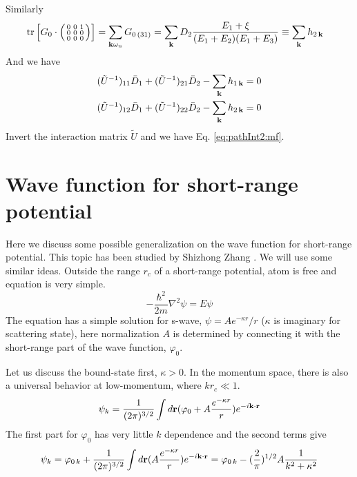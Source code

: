 Similarly
\begin{equation}
\begin{split}
\text{tr}\left[{G_{0}}\cdot\left(\begin{smallmatrix}0&0&1\\0&0&0\\0&0&0\end{smallmatrix}\right)\right]&=\sum_{\mathbf{k}\omega_{n}}G_{0\,(31)}
=\sum_{\mathbf{k}}D_{2}\frac{E_{1}+\xi}{(E_{1}+E_{2})(E_{1}+E_{3})}\equiv\sum_{\mathbf{k}}h_{2\,\mathbf{k}}
\end{split}
\end{equation}
And we have 
 \begin{align*}
(\tilde{U}^{-1})_{11}\bar{D}_{1}+(\tilde{U}^{-1})_{21}\bar{D}_{2}-\sum_{\mathbf{k}}h_{1\,\mathbf{k}}=0\\
(\tilde{U}^{-1})_{12}\bar{D}_{1}+(\tilde{U}^{-1})_{22}\bar{D}_{2}-\sum_{\mathbf{k}}h_{2\,\mathbf{k}}=0
 \end{align*}
Invert the interaction matrix $\tilde{U}$ and we have Eq.  \ref{eq:pathInt2:mf}.


\section{Wave function for short-range potential}\label{sec:pathInt2:short-range}
Here we discuss some possible generalization on the wave function for short-range potential.  This topic has been studied by Shizhong Zhang \cite{shizhongUniv}. We will use some similar ideas.  Outside the range $r_{c}$ of a short-range potential,  atom is free and  \sch equation is very simple.
\begin{equation}
-\frac{\hbar^{2}}{2m}\nabla^{2}\psi=E\psi
\end{equation}
The equation has a simple solution for s-wave, $\psi=A{e^{-\kappa{r}}}/{r}$ ($\kappa$ is imaginary for scattering state), here normalization $A$ is determined  by connecting it with the short-range part of the wave function, $\varphi_0$. 

Let us discuss the bound-state first, $\kappa>0$.  In the momentum space, there is also a universal behavior at low-momentum, where $kr_{c}\ll1$.   
\begin{equation*}
\psi_{k}=\frac{1}{(2\pi)^{3/2}}\int{d\ensuremath{\mathbf{r}}}(\varphi_{0}+A\frac{e^{-\kappa{r}}}{r})e^{-i\mathbf{k}\cdot\mathbf{r}}
\end{equation*}
The first part for $\varphi_{0}$ has very little $k$ dependence and the second terms give
\begin{equation*}
\psi_{k}=\varphi_{0\,k}+\frac{1}{(2\pi)^{3/2}}\int{d\ensuremath{\mathbf{r}}}(A\frac{e^{-\kappa{r}}}{r})e^{-i\mathbf{k}\cdot\mathbf{r}}=\varphi_{0\,k}-(\frac{2}{\pi})^{1/2}A\frac{1}{k^{2}+\kappa^{2}}
\end{equation*}


